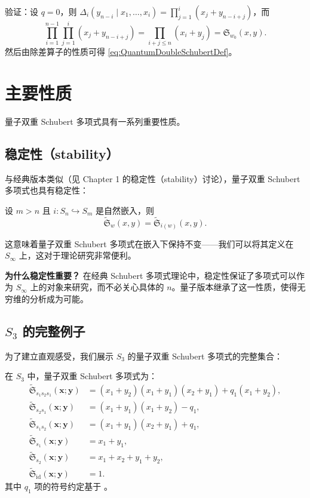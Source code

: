 验证：设 $q=0$，则 $\Delta_i(y_{n-i} \mid x_1, \ldots, x_i) = \prod_{j=1}^i (x_j + y_{n-i+j})$，而
\[
\prod_{i=1}^{n-1} \prod_{j=1}^i (x_j + y_{n-i+j}) = \prod_{i+j \leq n}(x_i + y_j) = \mathfrak{S}_{w_0}(x,y).
\]
然后由除差算子的性质可得 \eqref{eq:QuantumDoubleSchubertDef}。

\section{主要性质}
\label{sec:MainProperties}

量子双重 Schubert 多项式具有一系列重要性质。

\subsection{稳定性（stability）}

与经典版本类似（见 Chapter 1 的稳定性（stability）讨论），量子双重 Schubert 多项式也具有稳定性：

\begin{Proposition}[稳定性]
\label{prop:QuantumStability}
设 $m > n$ 且 $i: S_n \hookrightarrow S_m$ 是自然嵌入，则
\[
\widetilde{\mathfrak{S}}_w(x,y) = \widetilde{\mathfrak{S}}_{i(w)}(x,y).
\label{eq:QuantumStability}
\]
\end{Proposition}

这意味着量子双重 Schubert 多项式在嵌入下保持不变——我们可以将其定义在 $S_\infty$ 上，这对于理论研究非常便利。

\textbf{为什么稳定性重要？} 在经典 Schubert 多项式理论中，稳定性保证了多项式可以作为 $S_\infty$ 上的对象来研究，而不必关心具体的 $n$。量子版本继承了这一性质，使得无穷维的分析成为可能。

\subsection{$S_3$ 的完整例子}

为了建立直观感受，我们展示 $S_3$ 的量子双重 Schubert 多项式的完整集合：

\begin{Example}
在 $S_3$ 中，量子双重 Schubert 多项式为：
\begin{align*}
\widetilde{\mathfrak{S}}_{s_1s_2s_1}(\mathbf{x}; \mathbf{y}) &= (x_1+y_2)(x_1+y_1)(x_2+y_1) + q_1(x_1+y_2), \\
\widetilde{\mathfrak{S}}_{s_2s_1}(\mathbf{x}; \mathbf{y}) &= (x_1+y_1)(x_1+y_2) - q_1, \\
\widetilde{\mathfrak{S}}_{s_1s_2}(\mathbf{x}; \mathbf{y}) &= (x_1+y_1)(x_2+y_1) + q_1, \\
\widetilde{\mathfrak{S}}_{s_1}(\mathbf{x}; \mathbf{y}) &= x_1 + y_1, \\
\widetilde{\mathfrak{S}}_{s_2}(\mathbf{x}; \mathbf{y}) &= x_1 + x_2 + y_1 + y_2, \\
\widetilde{\mathfrak{S}}_{\mathrm{id}}(\mathbf{x}; \mathbf{y}) &= 1.
\end{align*}%
其中 $q_1$ 项的符号约定基于 \cite[ Section 4]{KM}。
\end{Example}

